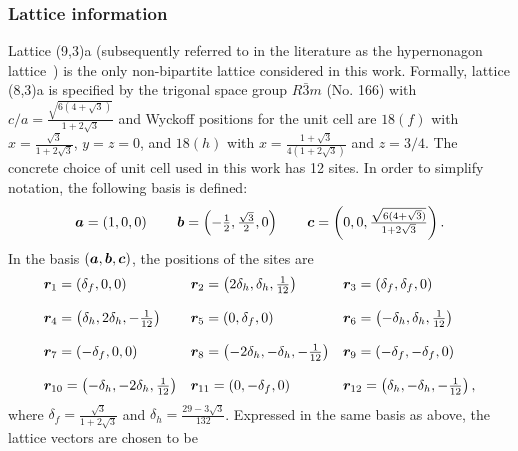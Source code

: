 \subsubsection{Lattice information}
%
%
Lattice (9,3)a (subsequently referred to in the literature as the hypernonagon lattice~\cite{YasuyukiPRB2017,KatoPB2018,MasahikoPRL2018}) is the only non-bipartite lattice considered in this work.
Formally, lattice (8,3)a is specified by the trigonal space group $R\bar{3}m$ (No. 166) with $c/a = \frac{\sqrt{6(4 + \sqrt{3})}}{1 + 2\sqrt{3}}$ and Wyckoff positions for the unit cell are $18(f)$ with $x = \frac{\sqrt{3}}{1 + 2\sqrt{3}}$, $y = z = 0$, and $18(h)$ with $x = \frac{1 + \sqrt{3}}{4(1 + 2\sqrt{3})}$ and $z = 3/4$.
The concrete choice of unit cell used in this work has 12 sites.
In order to simplify notation, the following basis is defined:
%
\begin{equation}
	\begin{matrix*}[l]
		\ba = \left(1, 0, 0\right) \qquad
		\bb = \left(-\frac{1}{2}, \frac{\sqrt{3}}{2}, 0\right) \qquad
		\bc = \left(0, 0, \frac{\sqrt{6(4 + \sqrt{3})}}{1 + 2\sqrt{3}}\right).
	\end{matrix*}
\end{equation}
%
In the basis $(\bm{a}, \bm{b}, \bm{c})$, the positions of the sites are
%
\begin{equation}
	\begin{matrix*}[l]
		\br_{1} = \left(\delta_f, 0, 0\right) &
		\br_{2} = \left(2\delta_h, \delta_h, \frac{1}{12}\right) &
		\br_{3} = \left(\delta_f, \delta_f, 0\right) \\
		&\\
		\br_{4} = \left(\delta_h, 2\delta_h, -\frac{1}{12}\right) &
		\br_{5} = \left(0, \delta_f, 0\right) &
		\br_{6} = \left(-\delta_h, \delta_h, \frac{1}{12}\right) \\
		&\\
		\br_{7} = \left(-\delta_f, 0, 0\right) &
		\br_{8} = \left(-2\delta_h, -\delta_h, -\frac{1}{12}\right) &
		\br_{9} = \left(-\delta_f, -\delta_f, 0\right) \\
		&\\
		\br_{10} = \left(-\delta_h, -2\delta_h, \frac{1}{12}\right) &
		\br_{11} = \left(0, -\delta_f, 0\right) &
		\br_{12} = \left(\delta_h, -\delta_h, -\frac{1}{12}\right),
	\end{matrix*}
\end{equation}
%
where $\delta_f = \frac{\sqrt{3}}{1 + 2\sqrt{3}}$ and $\delta_h = \frac{29 - 3\sqrt{3}}{132}$.
Expressed in the same basis as above, the lattice vectors are chosen to be
